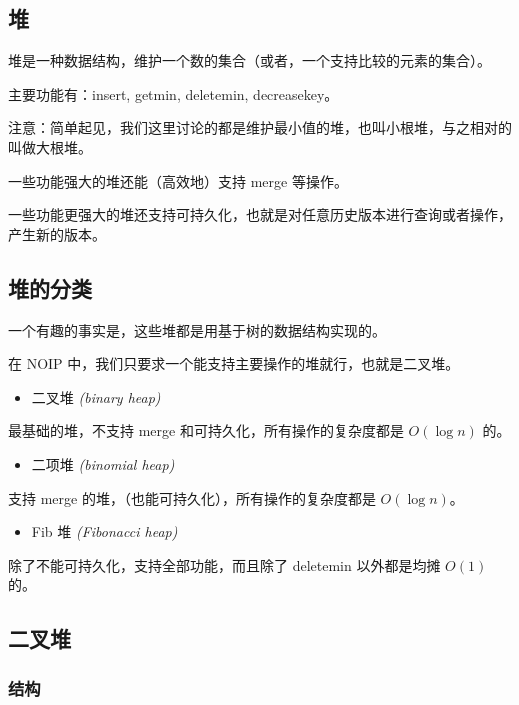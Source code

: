 
\subsection{堆}

堆是一种数据结构，维护一个数的集合（或者，一个支持比较的元素的集合）。

主要功能有：insert, getmin, deletemin, decreasekey。

注意：简单起见，我们这里讨论的都是维护最小值的堆，也叫小根堆，与之相对的叫做大根堆。

一些功能强大的堆还能（高效地）支持 merge 等操作。

一些功能更强大的堆还支持可持久化，也就是对任意历史版本进行查询或者操作，产生新的版本。

\subsection{堆的分类}

一个有趣的事实是，这些堆都是用基于树的数据结构实现的。

在 NOIP 中，我们只要求一个能支持主要操作的堆就行，也就是二叉堆。

\begin{itemize}
\item 二叉堆 {\em (binary heap) }
\end{itemize}

最基础的堆，不支持 merge 和可持久化，所有操作的复杂度都是 $O(\log n)$ 的。

\begin{itemize}
\item 二项堆 {\em (binomial heap) }
\end{itemize}

支持 merge 的堆，（也能可持久化），所有操作的复杂度都是 $O(\log n)$。

\begin{itemize}
\item Fib 堆 {\em (Fibonacci heap) }
\end{itemize}

除了不能可持久化，支持全部功能，而且除了 deletemin 以外都是均摊 $O(1)$ 的。

\subsection{二叉堆}

\subsubsection{结构}

